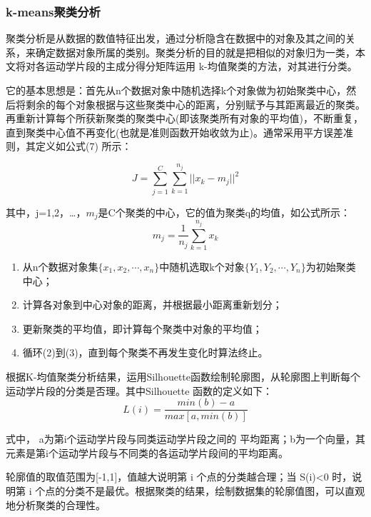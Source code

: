 \documentclass[bwprint]{gmcmthesis}
\begin{document}
\subsubsection{k-means聚类分析}
聚类分析是从数据的数值特征出发，通过分析隐含在数据中的对象及其之间的关系，来确定数据对象所属的类别。聚类分析的目的就是把相似的对象归为一类，本文将对各运动学片段的主成分得分矩阵运用 k-均值聚类的方法，对其进行分类。

它的基本思想是：首先从n个数据对象中随机选择k个对象做为初始聚类中心，然后将剩余的每个对象根据与这些聚类中心的距离，分别赋予与其距离最近的聚类。再重新计算每个所获新聚类的聚类中心(即该聚类所有对象的平均值)，不断重复，直到聚类中心值不再变化(也就是准则函数开始收敛为止)。通常采用平方误差准则，其定义如公式(7) 所示：

\begin{equation}
J=\sum\limits^C_{j=1}\sum\limits^{n_j}_{k=1}||x_k-m_j||^2
\end{equation}

其中，j=1,2，…，$m_j$是C个聚类的中心，它的值为聚类q的均值，如公式所示：
\begin{equation}
m_j=\frac{1}{n_j}\sum\limits^{n_j}_{k=1}x_k
\end{equation}


\begin{enumerate}
\item 从n个数据对象集$\{x_1,x_2,\cdots,x_n\}$中随机选取k个对象$\{Y_1,Y_2,\cdots,Y_n\}$为初始聚类中心；
\item	计算各对象到中心对象的距离，并根据最小距离重新划分； 
\item 更新聚类的平均值，即计算每个聚类中对象的平均值；
\item	循环(2)到(3)，直到每个聚类不再发生变化时算法终止。

\end{enumerate}

\newline
根据K-均值聚类分析结果，运用Silhouette函数绘制轮廓图，从轮廓图上判断每个运动学片段的分类是否理\cite{c5}。其中Silhouette 函数的定义如下：
\begin{equation}
L(i)=\frac{min(b)-a}{max[a,min(b)]}
\end{equation}

式中， a为第i个运动学片段与同类运动学片段之间的 平均距离；b为一个向量，其元素是第i个运动学片段与不同类的各运动学片段间的平均距离。

轮廓值的取值范围为[-1,1]，值越大说明第 i 个点的分类越合理；当 S(i)<0 时，说明第 i 个点的分类不是最优。根据聚类的结果，绘制数据集的轮廓值图，可以直观地分析聚类的合理性。
\end{document}
